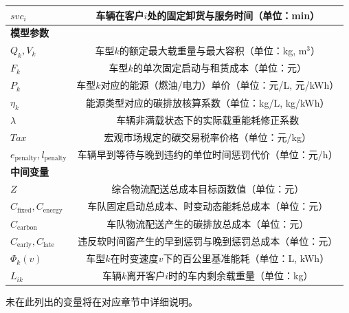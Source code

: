 \documentclass[12pt,a4paper]{article}
\begin{document}
\begin{table}[H]
\begin{tabular}{@{}lc@{}}
    $svc_i$ & 车辆在客户$i$处的固定卸货与服务时间（单位：min） \\
    \midrule
    \multicolumn{2}{l}{\textbf{模型参数}} \\
    $Q_k, V_k$ & 车型$k$的额定最大载重量与最大容积（单位：kg, m$^3$） \\
    $F_k$ & 车型$k$的单次固定启动与租赁成本（单位：元） \\
    $P_k$ & 车型$k$对应的能源（燃油/电力）单价（单位：元/L, 元/kWh） \\
    $\eta_k$ & 能源类型对应的碳排放核算系数（单位：kg/L, kg/kWh） \\
    $\lambda$ & 车辆非满载状态下的实际载重能耗修正系数 \\
    $Tax$ & 宏观市场规定的碳交易税率价格（单位：元/kg） \\
    $e_{\text{penalty}}, l_{\text{penalty}}$ & 车辆早到等待与晚到违约的单位时间惩罚代价（单位：元/h） \\
    \midrule
    \multicolumn{2}{l}{\textbf{中间变量}} \\
    $Z$ & 综合物流配送总成本目标函数值（单位：元） \\
    $C_{\text{fixed}}, C_{\text{energy}}$ & 车队固定启动总成本、时变动态能耗总成本（单位：元） \\
    $C_{\text{carbon}}$ & 车队物流配送产生的碳排放总成本（单位：元） \\
    $C_{\text{early}}, C_{\text{late}}$ & 违反软时间窗产生的早到惩罚与晚到惩罚总成本（单位：元） \\
    $\Phi_k(v)$ & 车型$k$在时变速度$v$下的百公里基准能耗（单位：L, kWh） \\
    $L_{ik}$ & 车辆$k$离开客户$i$时的车内剩余载重量（单位：kg） \\
    \bottomrule
  \end{tabular}
  \vspace{0.5em}
  
  \footnotesize 未在此列出的变量将在对应章节中详细说明。
\end{table}
\end{document}
